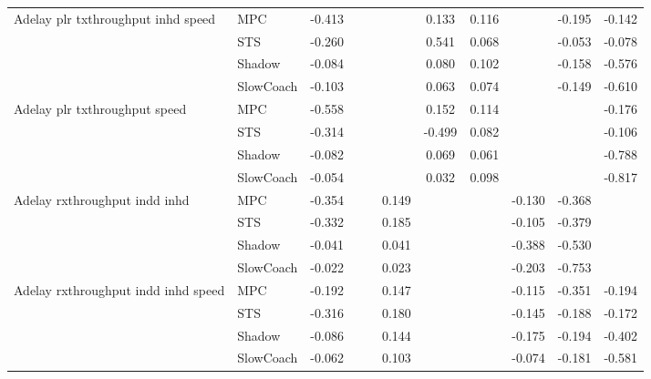 \begin{tabular}{|l|l|*{9}{c|}}
\midrule
Adelay plr txthroughput inhd speed    & MPC &   -0.413 &        &        &     &  0.133 &  0.116 &      &  -0.195 &   -0.142 \\
                              & STS &   -0.260 &        &        &     &  0.541 &  0.068 &      &  -0.053 &   -0.078 \\
                              & Shadow &   -0.084 &        &        &     &  0.080 &  0.102 &      &  -0.158 &   -0.576 \\
                              & SlowCoach &   -0.103 &        &        &     &  0.063 &  0.074 &      &  -0.149 &   -0.610 \\
\midrule
Adelay plr txthroughput speed    & MPC &   -0.558 &        &        &     &  0.152 &  0.114 &      &      &   -0.176 \\
                              & STS &   -0.314 &        &        &     & -0.499 &  0.082 &      &      &   -0.106 \\
                              & Shadow &   -0.082 &        &        &     &  0.069 &  0.061 &      &      &   -0.788 \\
                              & SlowCoach &   -0.054 &        &        &     &  0.032 &  0.098 &      &      &   -0.817 \\
\midrule
Adelay rxthroughput indd inhd    & MPC &   -0.354 &        &        &  0.149 &     &     &  -0.130 &  -0.368 &       \\
                              & STS &   -0.332 &        &        &  0.185 &     &     &  -0.105 &  -0.379 &       \\
                              & Shadow &   -0.041 &        &        &  0.041 &     &     &  -0.388 &  -0.530 &       \\
                              & SlowCoach &   -0.022 &        &        &  0.023 &     &     &  -0.203 &  -0.753 &       \\
\midrule
Adelay rxthroughput indd inhd speed    & MPC &   -0.192 &        &        &  0.147 &     &     &  -0.115 &  -0.351 &   -0.194 \\
                              & STS &   -0.316 &        &        &  0.180 &     &     &  -0.145 &  -0.188 &   -0.172 \\
                              & Shadow &   -0.086 &        &        &  0.144 &     &     &  -0.175 &  -0.194 &   -0.402 \\
                              & SlowCoach &   -0.062 &        &        &  0.103 &     &     &  -0.074 &  -0.181 &   -0.581 \\

\end{tabular}
